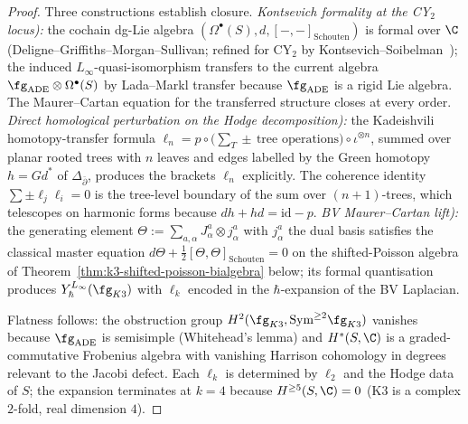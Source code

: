 \begin{proof}
Three constructions establish closure. \emph{Kontsevich
formality at the CY$_2$ locus):} the cochain dg-Lie algebra
$(\Omega^\bullet(S), d, [-,-]_{\mathrm{Schouten}})$ is formal over
$\C$ (Deligne--Griffiths--Morgan--Sullivan; refined for CY$_2$ by
Kontsevich--Soibelman~\cite{KontsevichSoibelman2009}); the induced
$L_\infty$-quasi-isomorphism transfers to the current algebra
$\fg_{\mathrm{ADE}} \otimes \Omega^\bullet(S)$ by Lada--Markl transfer
\cite{LadaMarkl1995} because $\fg_{\mathrm{ADE}}$ is a rigid Lie
algebra. The Maurer--Cartan equation for the transferred structure
closes at every order. \emph{Direct homological perturbation
on the Hodge decomposition):} the Kadeishvili homotopy-transfer
formula $\ell_n = p \circ \bigl(\sum_{T} \pm\,\text{tree operations}\bigr)
\circ \iota^{\otimes n}$, summed over planar rooted trees with $n$
leaves and edges labelled by the Green homotopy $h = G d^*$ of
$\Delta_{\bar\partial}$, produces the brackets $\ell_n$ explicitly.
The coherence identity $\sum \pm \ell_j \ell_i = 0$ is the tree-level
boundary of the sum over $(n+1)$-trees, which telescopes on harmonic
forms because $d h + h d = \mathrm{id} - p$. \emph{BV
Maurer--Cartan lift):} the generating element
$\Theta := \sum_{a, \alpha} J^a_\alpha \otimes j^a_\alpha$ with
$j^a_\alpha$ the dual basis satisfies the classical master equation
$d\Theta + \tfrac12 [\Theta, \Theta]_{\mathrm{Schouten}} = 0$ on the
shifted-Poisson algebra of
Theorem~\ref{thm:k3-shifted-poisson-bialgebra} below; its formal
quantisation produces $Y_\hbar^{L_\infty}(\fg_{K3})$ with $\ell_k$
encoded in the $\hbar$-expansion of the BV Laplacian.

Flatness follows: the obstruction group
$H^2(\fg_{K3}, \mathrm{Sym}^{\geq 2}\fg_{K3})$ vanishes because
$\fg_{\mathrm{ADE}}$ is semisimple (Whitehead's lemma) and
$H^*(S, \C)$ is a graded-commutative Frobenius algebra with vanishing
Harrison cohomology in degrees relevant to the Jacobi defect. Each
$\ell_k$ is determined by $\ell_2$ and the Hodge data of $S$; the
expansion terminates at $k = 4$ because $H^{\geq 5}(S, \C) = 0$
(K$3$ is a complex $2$-fold, real dimension $4$).
\end{proof}


